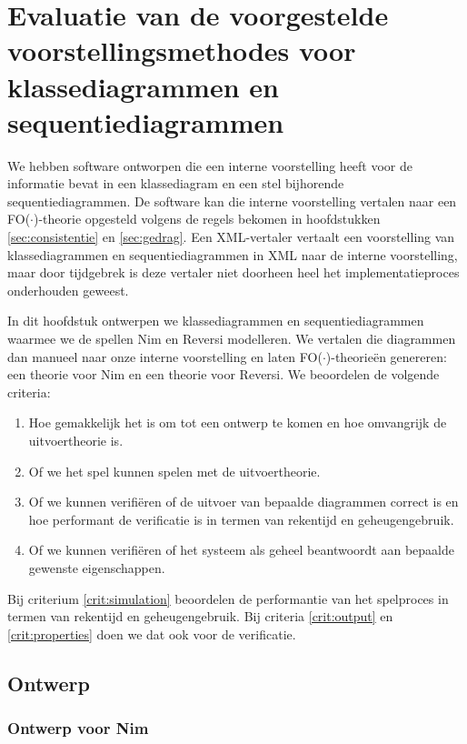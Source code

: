 \chapter{Evaluatie van de voorgestelde voorstellingsmethodes voor klassediagrammen en sequentiediagrammen}\label{sec:evaluatie}
We hebben software ontworpen die een interne voorstelling heeft voor de informatie bevat in een klassediagram en een stel bijhorende sequentiediagrammen. De software kan die interne voorstelling vertalen naar een FO($\cdot$)-theorie opgesteld volgens de regels bekomen in hoofdstukken \ref{sec:consistentie} en \ref{sec:gedrag}. Een XML-vertaler vertaalt een voorstelling van klassediagrammen en sequentiediagrammen in XML naar de interne voorstelling, maar door tijdgebrek is deze vertaler niet doorheen heel het implementatieproces onderhouden geweest.

In dit hoofdstuk ontwerpen we klassediagrammen en sequentiediagrammen waarmee we de spellen Nim en Reversi modelleren. We vertalen die diagrammen dan manueel naar onze interne voorstelling en laten FO($\cdot$)-theorie\"en genereren: een theorie voor Nim en een theorie voor Reversi. We beoordelen de volgende criteria:

\begin{enumerate}
	\item Hoe gemakkelijk het is om tot een ontwerp te komen en hoe omvangrijk de uitvoertheorie is.\label{crit:design}
	\item Of we het spel kunnen spelen met de uitvoertheorie.\label{crit:simulation}
	\item Of we kunnen verifi\"eren of de uitvoer van bepaalde diagrammen correct is en hoe performant de verificatie is in termen van rekentijd en geheugengebruik.\label{crit:output}
	\item Of we kunnen verifi\"eren of het systeem als geheel beantwoordt aan bepaalde gewenste eigenschappen.\label{crit:properties}
\end{enumerate}

Bij criterium \ref{crit:simulation} beoordelen de performantie van het spelproces in termen van rekentijd en geheugengebruik. Bij criteria \ref{crit:output} en \ref{crit:properties} doen we dat ook voor de verificatie.

\section{Ontwerp}

\subsection{Ontwerp voor Nim}

